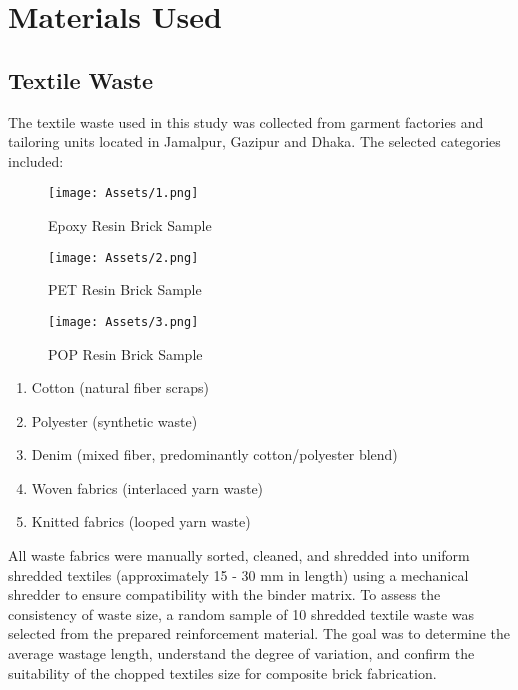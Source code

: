 \section{Materials Used}
\subsection{Textile Waste}
The textile waste used in this study was collected from garment factories and tailoring units located in Jamalpur, Gazipur and Dhaka. The selected categories included:

\begin{figure}[ht]
	\centering
	\begin{minipage}{0.30\textwidth}
		\centering
		\texttt{[image: Assets/1.png]}
		\caption{Epoxy Resin Brick Sample}
	\end{minipage}
	\hfill
	\begin{minipage}{0.30\textwidth}
		\centering
		\texttt{[image: Assets/2.png]}
		\caption{PET Resin Brick Sample}
	\end{minipage}
	\hfill
	\begin{minipage}{0.30\textwidth}
		\centering
		\texttt{[image: Assets/3.png]}
		\caption{POP Resin Brick Sample}
	\end{minipage}
\end{figure}

\begin{enumerate}
	\item Cotton (natural fiber scraps)
	\item Polyester (synthetic waste)
	\item Denim (mixed fiber, predominantly cotton/polyester blend)
	\item Woven fabrics (interlaced yarn waste)
	\item Knitted fabrics (looped yarn waste)
\end{enumerate}
All waste fabrics were manually sorted, cleaned, and shredded into uniform shredded textiles (approximately 15 - 30 mm in length) using a mechanical shredder to ensure compatibility with the binder matrix. To assess the consistency of waste size, a random sample of 10 shredded textile waste was selected from the prepared reinforcement material. The goal was to determine the average wastage length, understand the degree of variation, and confirm the suitability of the chopped textiles size for composite brick fabrication.